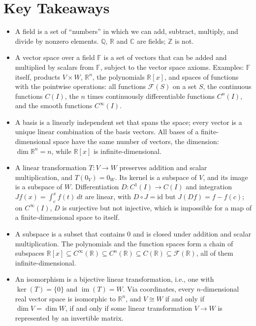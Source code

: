 \documentclass[11pt]{article}
\theoremstyle{definition}
\theoremstyle{plain}
\theoremstyle{remark}
\DeclareMathOperator{\im}{im}
\begin{document}
\section{Key Takeaways}
\begin{itemize}[leftmargin=*]
	\item A field is a set of ``numbers'' in which we can add, subtract, multiply, and divide by nonzero elements. $\mathbb{Q}$, $\mathbb{R}$ and $\mathbb{C}$ are fields; $\mathbb{Z}$ is not.
	\item A vector space over a field $\mathbb{F}$ is a set of vectors that can be added and multiplied by scalars from $\mathbb{F}$, subject to the vector space axioms. Examples: $\mathbb{F}$ itself, products $V \times W$, $\mathbb{R}^n$, the polynomials $\mathbb{R}[x]$, and spaces of functions with the pointwise operations: all functions $\mathcal{F}(S)$ on a set $S$, the continuous functions $C(I)$, the $n$ times continuously differentiable functions $C^n(I)$, and the smooth functions $C^\infty(I)$.
	\item A basis is a linearly independent set that spans the space; every vector is a unique linear combination of the basis vectors. All bases of a finite-dimensional space have the same number of vectors, the dimension: $\dim \mathbb{R}^n = n$, while $\mathbb{R}[x]$ is infinite-dimensional.
	\item A linear transformation $T: V \to W$ preserves addition and scalar multiplication, and $T(0_V) = 0_W$. Its kernel is a subspace of $V$, and its image is a subspace of $W$. Differentiation $D: C^1(I) \to C(I)$ and integration $J f(x) = \int_c^x f(t)\, dt$ are linear, with $D \circ J = \mathrm{id}$ but $J(Df) = f - f(c)$; on $C^\infty(I)$, $D$ is surjective but not injective, which is impossible for a map of a finite-dimensional space to itself.
	\item A subspace is a subset that contains $0$ and is closed under addition and scalar multiplication. The polynomials and the function spaces form a chain of subspaces $\mathbb{R}[x] \subseteq C^\infty(\mathbb{R}) \subseteq C^n(\mathbb{R}) \subseteq C(\mathbb{R}) \subseteq \mathcal{F}(\mathbb{R})$, all of them infinite-dimensional.
	\item An isomorphism is a bijective linear transformation, i.e., one with $\ker(T) = \{0\}$ and $\im(T) = W$. Via coordinates, every $n$-dimensional real vector space is isomorphic to $\mathbb{R}^n$, and $V \cong W$ if and only if $\dim V = \dim W$, if and only if some linear transformation $V \to W$ is represented by an invertible matrix.

\end{itemize}
\end{document}
